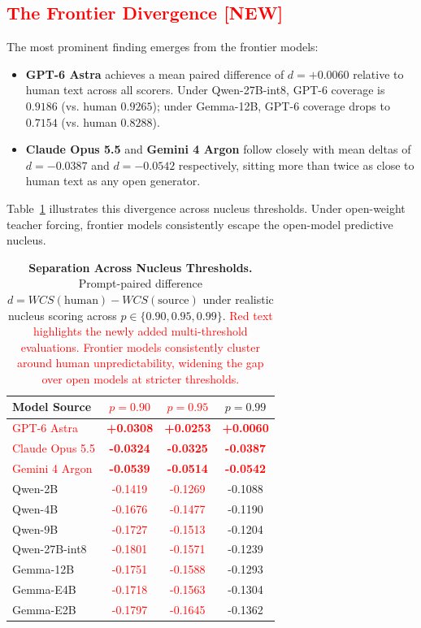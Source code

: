 \documentclass[11pt,a4paper,twocolumn]{article}
\newcommand{\diff}[1]{\textcolor{red}{#1}}
\newenvironment{diffblock}{\color{red}}{}
\begin{document}
\subsection{\diff{The Frontier Divergence [NEW]}}
\begin{diffblock}
The most prominent finding emerges from the frontier models:
\begin{itemize}
    \item \textbf{GPT-6 Astra} achieves a mean paired difference of \textbf{$d = +0.0060$} relative to human text across all scorers. Under Qwen-27B-int8, GPT-6 coverage is $0.9186$ (vs. human $0.9265$); under Gemma-12B, GPT-6 coverage drops to \textbf{$0.7154$} (vs. human $0.8288$).
    \item \textbf{Claude Opus 5.5} and \textbf{Gemini 4 Argon} follow closely with mean deltas of $d = -0.0387$ and $d = -0.0542$ respectively, sitting more than twice as close to human text as any open generator.
\end{itemize}
Table~\ref{tab:delta_distribution} illustrates this divergence across nucleus thresholds. Under open-weight teacher forcing, frontier models consistently escape the open-model predictive nucleus.
\end{diffblock}

\begin{table}[h]
\centering
\small
\setlength{\tabcolsep}{3pt}
\begin{tabular}{lccc}
\toprule
\textbf{Model Source} & \diff{\textbf{$p=0.90$}} & \diff{\textbf{$p=0.95$}} & \textbf{$p=0.99$} \\
\midrule
\diff{GPT-6 Astra} & \diff{\textbf{+0.0308}} & \diff{\textbf{+0.0253}} & \diff{\textbf{+0.0060}} \\
\diff{Claude Opus 5.5} & \diff{\textbf{-0.0324}} & \diff{\textbf{-0.0325}} & \diff{\textbf{-0.0387}} \\
\diff{Gemini 4 Argon} & \diff{\textbf{-0.0539}} & \diff{\textbf{-0.0514}} & \diff{\textbf{-0.0542}} \\
\midrule
Qwen-2B & \diff{-0.1419} & \diff{-0.1269} & -0.1088 \\
Qwen-4B & \diff{-0.1676} & \diff{-0.1477} & -0.1190 \\
Qwen-9B & \diff{-0.1727} & \diff{-0.1513} & -0.1204 \\
Qwen-27B-int8 & \diff{-0.1801} & \diff{-0.1571} & -0.1239 \\
Gemma-12B & \diff{-0.1751} & \diff{-0.1588} & -0.1293 \\
Gemma-E4B & \diff{-0.1718} & \diff{-0.1563} & -0.1304 \\
Gemma-E2B & \diff{-0.1797} & \diff{-0.1645} & -0.1362 \\
\bottomrule
\end{tabular}
\caption{\textbf{Separation Across Nucleus Thresholds.} Prompt-paired difference $d = WCS(\text{human}) - WCS(\text{source})$ under realistic nucleus scoring across $p \in \{0.90, 0.95, 0.99\}$. \diff{Red text highlights the newly added multi-threshold evaluations. Frontier models consistently cluster around human unpredictability, widening the gap over open models at stricter thresholds.}}
\label{tab:delta_distribution}
\end{table}
\end{document}
